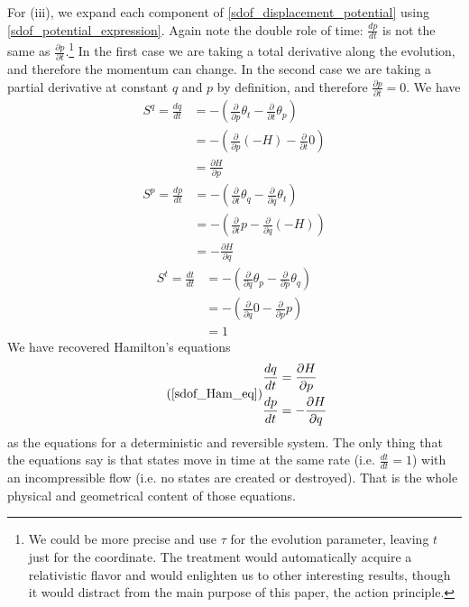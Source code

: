 \documentclass[10pt,twocolumn, nofootinbib]{revtex4-2}
\begin{document}
For (iii), we expand each component of \ref{sdof_displacement_potential} using \ref{sdof_potential_expression}. Again note the double role of time: $\frac{dp}{dt}$ is not the same as $\frac{\partial p}{\partial t}$.\footnote{We could be more precise and use $\tau$ for the evolution parameter, leaving $t$ just for the coordinate. The treatment would automatically acquire a relativistic flavor and would enlighten us to other interesting results, though it would distract from the main purpose of this paper, the action principle. } In the first case we are taking a total derivative along the evolution, and therefore the momentum can change. In the second case we are taking a partial derivative at constant $q$ and $p$ by definition, and therefore $\frac{\partial p}{\partial t}=0$. We have
\begin{equation}
\begin{aligned}
	S^q = \frac{dq}{dt}
	&= - \left( \frac{\partial}{\partial p} \theta_t - \frac{\partial}{\partial t} \theta_p \right) \\
	&= - \left( \frac{\partial}{\partial p} (-H) - \frac{\partial}{\partial t} 0 \right) \\
	& = \frac{\partial H}{\partial p}
\end{aligned}
\end{equation}
\begin{equation}
\begin{aligned}
	S^p = \frac{dp}{dt}
	&= - \left( \frac{\partial}{\partial t} \theta_q - \frac{\partial}{\partial q} \theta_t \right) \\
	&= - \left( \frac{\partial}{\partial t} p - \frac{\partial}{\partial q} (-H) \right) \\
	& = - \frac{\partial H}{\partial q}
\end{aligned}
\end{equation}
\begin{equation}
\begin{aligned}
	S^t = \frac{dt}{dt}
	&= - \left( \frac{\partial}{\partial q} \theta_p - \frac{\partial}{\partial p} \theta_q \right) \\
	&= - \left( \frac{\partial}{\partial q} 0 - \frac{\partial}{\partial p} p \right) \\
	& = 1
\end{aligned}
\end{equation}
We have recovered Hamilton's equations
\begin{equation}
\tag*{(\ref{sdof_Ham_eq})}
\begin{aligned}
	\frac{dq}{dt} &= \frac{\partial H}{\partial p} \\
	\frac{dp}{dt} &=-\frac{\partial H}{\partial q}
\end{aligned}
\end{equation}
as the equations for a deterministic and reversible system. The only thing that the equations say is that states move in time at the same rate (i.e. $\frac{dt}{dt} = 1$) with an incompressible flow (i.e. no states are created or destroyed). That is the whole physical and geometrical content of those equations.
\end{document}
